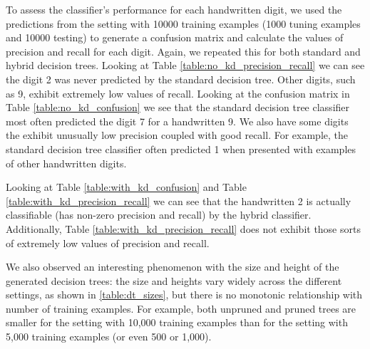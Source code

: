 To assess the classifier's performance for each handwritten digit, we used the predictions from the setting with 10000 training examples (1000 tuning examples and 10000 testing) to generate a confusion matrix and calculate the values of precision and recall for each digit.  Again, we repeated this for both standard and hybrid decision trees.  Looking at Table \ref{table:no_kd_precision_recall} we can see the digit 2 was never predicted by the standard decision tree.  Other digits, such as 9, exhibit extremely low values of recall. Looking at the confusion matrix in Table \ref{table:no_kd_confusion} we see that the standard decision tree classifier most often predicted the digit 7 for a handwritten 9.  We also have some digits the exhibit unusually low precision coupled with good recall.  For example, the standard decision tree classifier often predicted 1 when presented with examples of other handwritten digits.

Looking at Table \ref{table:with_kd_confusion} and Table \ref{table:with_kd_precision_recall} we can see that the handwritten 2 is actually classifiable (has non-zero precision and recall) by the hybrid classifier.  Additionally, Table \ref{table:with_kd_precision_recall} does not exhibit those sorts of extremely low values of precision and recall.

We also observed an interesting phenomenon with the size and height of the generated decision trees: the size and heights vary widely across the different settings, as shown in \ref{table:dt_sizes}, but there is no monotonic relationship with number of training examples.  For example, both unpruned and pruned trees are smaller for the setting with 10,000 training examples than for the setting with 5,000 training examples (or even 500 or 1,000).

